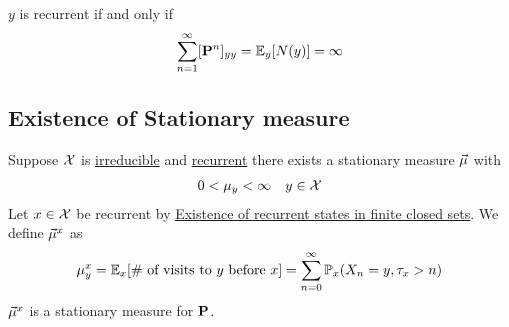\documentclass[12pt,a4paper]{article}
\begin{document}
\begin{thm}
$y$ is recurrent if and only if 
\begin{align*}
\sum\limits_{n=1}^{\infty} [\vb P^n]_{yy} = \mathbb{E}_y[N(y)] = \infty
\end{align*}
\end{thm}
\subsection{Existence of Stationary measure}
\begin{thm}
Suppose $\cal X$ is \hyperref[irreducible]{irreducible} and \hyperref[recurrent]{recurrent} there  exists a stationary measure $\va\mu$ with 
\begin{align*}
0<\mu_y < \infty && y\in \cal X
\end{align*}
Let $x\in \cal X$ be recurrent by \hyperref[finiteclosed]{Existence of recurrent states in finite closed sets}. We define $\va\mu^x$ as 
\begin{align*}
\mu_y^x = \mathbb{E}_x[\text{\# of visits to $y$ before $x$}] = \sum\limits_{n=0}^{\infty} \mathbb{P}_x(X_n = y, \tau_x > n)
\end{align*}
$\va\mu^x$ is a stationary measure for $\vb P$.
\end{thm}
\end{document}

